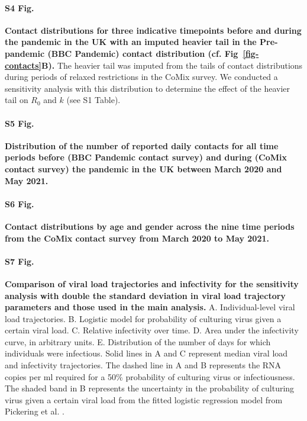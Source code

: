 \documentclass[
  10pt,
  letterpaper,
]{article}
\begin{document}
\paragraph*{S4 Fig.}
\label{fig-s4}
{\textbf{Contact distributions for three indicative timepoints before
and during the pandemic in the UK with an imputed heavier tail in the
Pre-pandemic (BBC Pandemic) contact distribution (cf.
Fig~\ref{fig-contacts}B).}} The heavier tail was imputed from the tails
of contact distributions during periods of relaxed restrictions in the
CoMix survey. We conducted a sensitivity analysis with this distribution
to determine the effect of the heavier tail on \(R_0\) and \(k\) (see S1
Table).

\paragraph*{S5 Fig.}
\label{fig-s5}
{\textbf{Distribution of the number of reported daily contacts for all
time periods before (BBC Pandemic contact survey) and during (CoMix
contact survey) the pandemic in the UK between March 2020 and May
2021.}}

\paragraph*{S6 Fig.}
\label{fig-s6}
{\textbf{Contact distributions by age and gender across the nine time
periods from the CoMix contact survey from March 2020 to May 2021.}}

\paragraph*{S7 Fig.}
\label{fig-s7}
{\textbf{Comparison of viral load trajectories and infectivity for the
sensitivity analysis with double the standard deviation in viral load
trajectory parameters and those used in the main analysis.}} A.
Individual-level viral load trajectories. B. Logistic model for
probability of culturing virus given a certain viral load. C. Relative
infectivity over time. D. Area under the infectivity curve, in arbitrary
units. E. Distribution of the number of days for which individuals were
infectious. Solid lines in A and C represent median viral load and
infectivity trajectories. The dashed line in A and B represents the RNA
copies per ml required for a 50\% probability of culturing virus or
infectiousness. The shaded band in B represents the uncertainty in the
probability of culturing virus given a certain viral load from the
fitted logistic regression model from Pickering et al.
\citep{pickering2021}.
\end{document}
